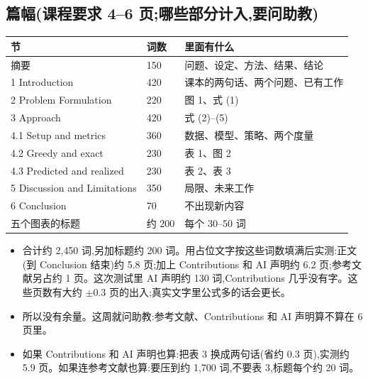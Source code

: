 \documentclass{article}
\newenvironment{pts}{\begin{itemize}[nosep,leftmargin=1.15em,topsep=1pt]}{\end{itemize}}
\begin{document}
\subsection*{篇幅(课程要求 4--6 页;哪些部分计入,要问助教)}
\begin{center}\small\renewcommand{\arraystretch}{0.88}
\begin{tabular}{@{}lll@{}}
\toprule
节 & 词数 & 里面有什么\\
\midrule
摘要 & 150 & 问题、设定、方法、结果、结论\\
1 Introduction & 420 & 课本的两句话、两个问题、已有工作\\
2 Problem Formulation & 220 & 图 1、式 (1)\\
3 Approach & 420 & 式 (2)--(5)\\
4.1 Setup and metrics & 360 & 数据、模型、策略、两个度量\\
4.2 Greedy and exact & 230 & 表 1、图 2\\
4.3 Predicted and realized & 230 & 表 2、表 3\\
5 Discussion and Limitations & 350 & 局限、未来工作\\
6 Conclusion & 70 & 不出现新内容\\
五个图表的标题 & 约 200 & 每个 30--50 词\\
\bottomrule
\end{tabular}
\end{center}
\begin{pts}
\item 合计约 2{,}450 词,另加标题约 200 词。用占位文字按这些词数填满后实测:正文(到 Conclusion 结束)约 5.8 页;加上 Contributions 和 AI 声明约 6.2 页;参考文献另占约 1 页。这次测试里 AI 声明约 130 词,Contributions 几乎没有字。这些页数有大约 $\pm 0.3$ 页的出入;真实文字里公式多的话会更长。
\item 所以没有余量。这周就问助教:参考文献、Contributions 和 AI 声明算不算在 6 页里。
\item 如果 Contributions 和 AI 声明也算:把表 3 换成两句话(省约 0.3 页),实测约 5.9 页。如果连参考文献也算:要压到约 1{,}700 词,不要表 3,标题每个约 20 词。
\end{pts}
\end{document}
